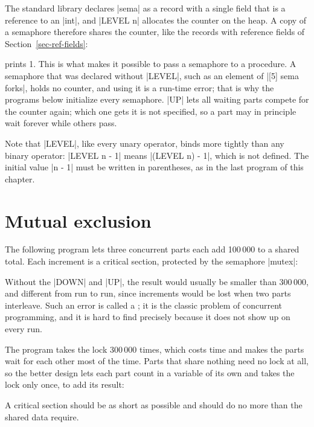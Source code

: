 The standard library declares \code|sema| as a record with a single field
that is a reference to an \code|int|, and \code|LEVEL n| allocates the
counter on the heap. A copy of a semaphore therefore shares the counter,
like the records with reference fields of Section~\ref{sec-ref-fields}:


\noindent prints 1. This is what makes it possible to pass a semaphore to
a procedure. A semaphore that was declared without \code|LEVEL|, such as
an element of \code|[5] sema forks|, holds no counter, and using it is a
run-time error; that is why the programs below initialize every
semaphore. \code|UP| lets all waiting parts compete for the counter again;
which one gets it is not specified, so a part may in principle wait
forever while others pass.

Note that \code|LEVEL|, like every unary operator, binds more tightly than
any binary operator: \code|LEVEL n - 1| means \code|(LEVEL n) - 1|, which
is not defined. The initial value \code|n - 1| must be written in
parentheses, as in the last program of this chapter.

\section{Mutual exclusion}\label{sec-mutex}

The following program lets three concurrent parts each add 100\,000 to a
shared total. Each increment is a critical section, protected by the
semaphore \code|mutex|:


Without the \code|DOWN| and \code|UP|, the result would usually be smaller
than 300\,000, and different from run to run, since increments would be
lost when two parts interleave. Such an error is called a ; it is the classic problem of concurrent programming, and it
is hard to find precisely because it does not show up on every run.

The program takes the lock 300\,000 times, which costs time and makes the
parts wait for each other most of the time. Parts that share nothing need
no lock at all, so the better design lets each part count in a variable
of its own and takes the lock only once, to add its result:


A critical section should be as short as possible and should do no more
than the shared data require.

